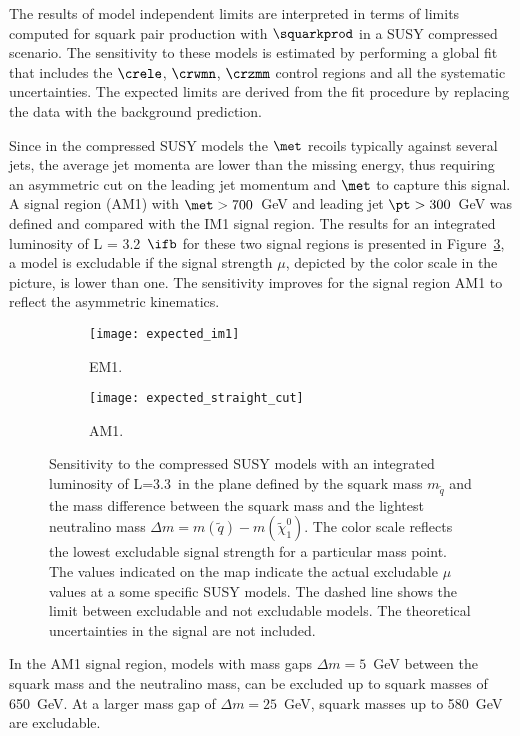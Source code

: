 The results of model independent limits are interpreted in terms of limits
computed for squark pair production with $\squarkprod$ in a SUSY compressed
scenario. The sensitivity to these models is estimated by performing a global
fit that includes the $\crele$, $\crwmn$, $\crzmm$ control regions and all the
systematic uncertainties. The expected limits are derived from the fit procedure
by replacing the data with the background prediction.

Since in the compressed SUSY models the $\met$ recoils typically against several
jets, the average jet momenta are lower than the missing energy, thus requiring
an asymmetric cut on the leading jet momentum and $\met$ to capture this
signal. A signal region (AM1) with $\met > 700$~GeV and leading jet
$\pt > 300$~GeV was defined and compared with the IM1 signal region. The results
for an integrated luminosity of L = 3.2~$\ifb$ for these two signal regions is
presented in Figure~\ref{fig:im1_straight_comparison}, a model is excludable if
the signal strength $\mu$, depicted by the color scale in the picture, is lower
than one. The sensitivity improves for the signal region AM1 to reflect the
asymmetric kinematics.
\begin{figure}[!h]
  \centering
  \begin{subfigure}[t]{.48\linewidth}
    \texttt{[image: expected\_im1]}
    \caption{EM1.}
    \label{fig:expected_im1}
  \end{subfigure}
  \begin{subfigure}[t]{.48\linewidth}
    \texttt{[image: expected\_straight\_cut]}
    \caption{AM1.}
    \label{fig:expected_straight}
  \end{subfigure}
  \caption{Sensitivity to the compressed SUSY models with an integrated
    luminosity of L=3.3\ifb ~in the plane defined by the squark mass
    $m_{\tilde{q}}$ and the mass difference between the squark mass and the
    lightest neutralino mass
    $\Delta m = m(\tilde{q}) - m(\tilde{\chi}_{1}^{0})$. The color scale
    reflects the lowest excludable signal strength for a particular mass
    point. The values indicated on the map indicate the actual excludable $\mu$
    values at a some specific SUSY models. The dashed line shows the limit
    between excludable and not excludable models. The theoretical uncertainties
    in the signal are not included.}
  \label{fig:im1_straight_comparison}
\end{figure}
In the AM1 signal region, models with mass gaps $\Delta m = 5$~GeV between the
squark mass and the neutralino mass, can be excluded up to squark masses of
650~GeV. At a larger mass gap of $\Delta m = 25$~GeV, squark masses up to
580~GeV are excludable.

